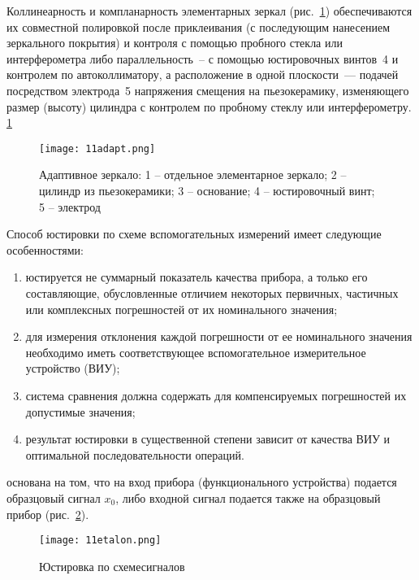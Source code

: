 Коллинеарность и компланарность элементарных зеркал (рис.~\ref{pic:11adapt}) обеспечиваются их совместной полировкой после приклеивания (с последующим нанесением зеркального покрытия) и контроля с помощью пробного стекла или интерферометра либо параллельность~-- с помощью юстировочных винтов~4 и контролем по автоколлиматору, а расположение в одной плоскости~--- подачей посредством электрода~5 напряжения смещения на пьезокерамику, изменяющего размер (высоту) цилиндра с контролем по пробному стеклу или интерферометру.
\ref{pic:11adapt}

\begin{figure}[h!]
	\texttt{[image: 11adapt.png]}
	\caption[Адаптивное зеркало]{ Адаптивное зеркало: 1 -- отдельное элементарное зеркало; 2 -- цилиндр из пьезокерамики; 3 -- основание; 4 -- юстировочный винт; 5 -- электрод }
	\label{pic:11adapt}
\end{figure}

Способ юстировки по схеме вспомогательных измерений имеет следующие особенностями:
\begin{enumerate}
\item юстируется не суммарный показатель качества прибора, а только его составляющие, обусловленные отличием некоторых первичных, частичных или комплексных погрешностей от их номинального значения;
\item для измерения отклонения каждой погрешности от ее номинального значения необходимо иметь соответствующее вспомогательное измерительное устройство (ВИУ);
\item система сравнения должна содержать для компенсируемых погрешностей их допустимые значения;
\item результат юстировки в существенной степени зависит от качества ВИУ и оптимальной последовательности операций.
\end{enumerate}

 основана на том, что на вход прибора (функционального устройства) подается образцовый сигнал $ x_0 $, либо входной сигнал подается также на образцовый прибор (рис.~\ref{pic:11etalon}).

\begin{figure}[h!]
	\texttt{[image: 11etalon.png]}
	\caption[Юстировка по схеме образцовых сигналов]{ Юстировка по схеме сигналов }
	\label{pic:11etalon}
\end{figure}


